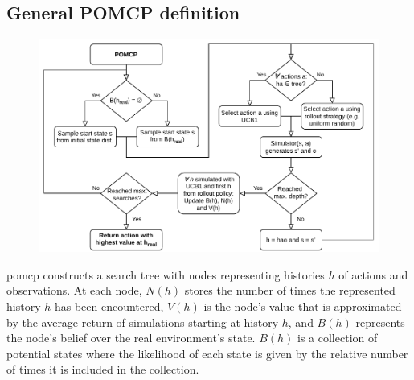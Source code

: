 \subsection{General POMCP definition}
\label{sec:pomcp}



\begin{figure}[htbp]
    \centerfloat
    \includegraphics[width=1.2\textwidth]{figures/POMCP.pdf}
\end{figure}


\Gls{pomcp} constructs a search tree with nodes representing histories $h$ of actions and observations. At each node, $N(h)$ stores the number of times the represented history $h$ has been encountered, $V(h)$ is the node's value that is approximated by the average return of simulations starting at history $h$, and $B(h)$ represents the node's belief over the real environment's state. $B(h)$ is a collection of potential states where the likelihood of each state is given by the relative number of times it is included in the collection.

